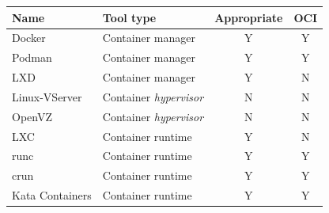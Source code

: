 \begin{center}
\begin{tabular}{|l|l|c|c|}
  \hline
  \textbf{Name} & \textbf{Tool type} & \textbf{Appropriate}\footnotemark & \textbf{OCI}\footnotemark \\
  \hline
  \hline
  Docker & Container manager & Y & Y\\
  Podman & Container manager & Y & Y\\
  LXD & Container manager & Y & N\\
  \hline
  Linux-VServer & Container \textit{hypervisor} & N & N \\
  OpenVZ & Container \textit{hypervisor} & N & N \\
  \hline
  LXC & Container runtime & Y & N \\
  runc & Container runtime & Y & Y \\
  crun & Container runtime & Y & Y \\
  Kata Containers & Container runtime & Y & Y \\
  \hline
\end{tabular}
\end{center}
